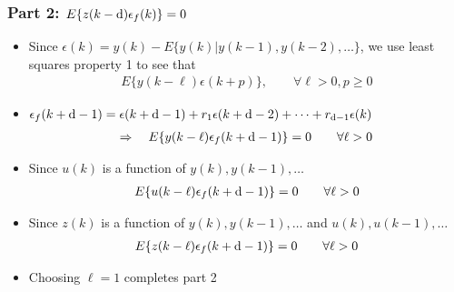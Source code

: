 \begin{frame}
    \frametitle{Part 2: $E\{z(k-\textrm{d})\epsilon_f(k)\} = 0$}

    \begin{itemize}
        \item
        Since $\epsilon(k) = y(k) - E\{y(k) | y(k-1),y(k-2),\ldots\}$, we use least squares property 1 to see that
        \begin{align*}
            E \{ y(k-\ell) \epsilon(k+p) \}, \qquad \forall \ell > 0, p \geq 0
        \end{align*}
        \paused

        \item
        $\epsilon_f(k+\textrm{d}-1) = \epsilon(k+\textrm{d}-1) + r_1 \epsilon(k+\textrm{d}-2) + \cdots + r_{\textrm{d}-1} \epsilon(k)$
        \begin{align*}
            \Rightarrow \quad E \{ y(k-\ell) \epsilon_f(k+\textrm{d}-1) \} = 0 \qquad \forall \ell > 0
        \end{align*}
        \paused

        \item
        Since $u(k)$ is a function of $y(k),y(k-1),\ldots$
        \begin{align*}
            E \{ u(k-\ell) \epsilon_f(k+\textrm{d}-1) \} = 0 \qquad \forall \ell > 0
        \end{align*}
        \paused

        \item
        Since $z(k)$ is a function of $y(k),y(k-1),\ldots$ and $u(k),u(k-1),\ldots$
        \begin{align*}
            E \{ z(k-\ell) \epsilon_f(k+\textrm{d}-1) \} = 0 \qquad \forall \ell > 0
        \end{align*}
        \paused

        \item
        Choosing $\ell = 1$ completes part 2
    \end{itemize}
\end{frame}


